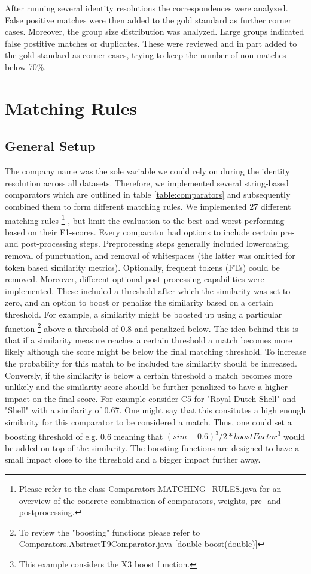 \documentclass[11pt,titlepage,oneside,openany]{book}
\begin{document}
After running several identity resolutions the correspondences were analyzed. False positive matches were then added to the gold standard as further corner cases. Moreover, the group size distribution was analyzed. Large groups indicated false postitive matches or duplicates. These were reviewed and in part added to the gold standard as corner-cases, trying to keep the number of non-matches below 70\%.

\section{Matching Rules}
\label{sec:matching-rules}

\subsection{General Setup}
The company name was the sole variable we could rely on during the identity resolution across all datasets. Therefore, we implemented several string-based comparators which are outlined in table \ref{table:comparators} and subsequently combined them to form different matching rules. We implemented 27 different matching rules%
\footnote{Please refer to the class Comparators.MATCHING\_RULES.java for an overview of the concrete combination of comparators, weights, pre- and postprocessing.}%
, but limit the evaluation to the best and worst performing based on their F1-scores.
Every comparator had options to include certain pre- and post-processing steps. Preprocessing steps generally included lowercasing, removal of punctuation, and removal of whitespaces (the latter was omitted for token based similarity metrics). Optionally, frequent tokens (FTs) could be removed. Moreover, different optional post-processing capabilities were implemented. These included a threshold after which the similarity was set to zero, and an option to boost or penalize the similarity based on a certain threshold. For example, a similarity might be boosted up using a particular function%
\footnote{To review the "boosting" functions please refer to Comparators.AbstractT9Comparator.java [double boost(double)]}%
 above a threshold of 0.8 and penalized below. The idea behind this is that if a similarity measure reaches a certain threshold a match becomes more likely although the score might be below the final matching threshold. To increase the probability for this match to be included the similarity should be increased. Conversly, if the similarity is below a certain threshold a match becomes more unlikely and the similarity score should be further penalized to have a higher impact on the final score. For example consider C5 for "Royal Dutch Shell" and "Shell" with a similarity of 0.67. One might say that this consitutes a high enough similarity for this comparator to be considered a match. Thus, one could set a boosting threshold of e.g. 0.6 meaning that $(sim - 0.6)^3/2*boostFactor$\footnote{This example considers the X3 boost function.} would be added on top of the similarity. The boosting functions are designed to have a small impact close to the threshold and a bigger impact further away. 
\end{document}
